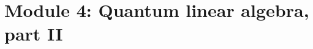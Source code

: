 \begin{comment}

\section{Linear Algebra Review}


\section{Math Review}


\section{Computing Review}


\subsection{Notes 04}


\subsection{Notes n05}


\section{Module 1 Quantum Strangeness}


\section{Module 2 Quantum Linear Algebra, Part I}


\section{Module 3 The Single Qubit}


\end{comment}

\section{Module 4: Quantum linear algebra, part II}


